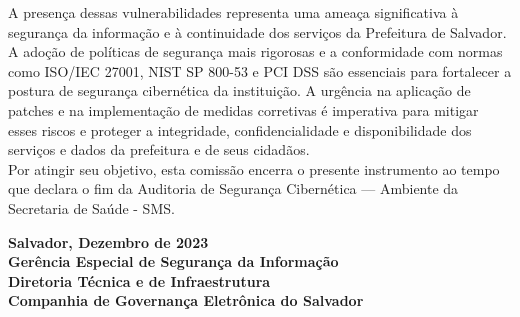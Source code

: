\documentclass[a4paper,12pt]{article}
\begin{document}
A presença dessas vulnerabilidades representa uma ameaça significativa à segurança da informação e à continuidade dos serviços da Prefeitura de Salvador. A adoção de políticas de segurança mais rigorosas e a conformidade com normas como ISO/IEC 27001, NIST SP 800-53 e PCI DSS são essenciais para fortalecer a postura de segurança cibernética da instituição. A urgência na aplicação de patches e na implementação de medidas corretivas é imperativa para mitigar esses riscos e proteger a integridade, confidencialidade e disponibilidade dos serviços e dados da prefeitura e de seus cidadãos.\\

Por atingir seu objetivo, esta comissão encerra o presente instrumento ao tempo que declara o fim da Auditoria de Segurança Cibernética — Ambiente da Secretaria de Saúde - SMS.

\vfill %

\begin{flushright}
\textbf{Salvador, Dezembro de 2023 \\
Gerência Especial de Segurança da Informação \\
Diretoria Técnica e de Infraestrutura \\
Companhia de Governança Eletrônica do Salvador}
\end{flushright}
\end{document}
